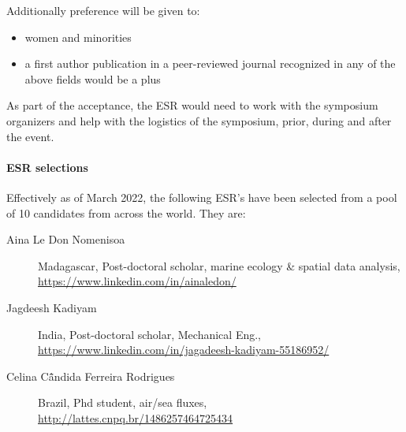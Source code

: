 \noindent
Additionally preference will be given to:

\begin{itemize}[noitemsep,topsep=0pt,parsep=0pt,partopsep=0pt]
\item women and minorities
\item a first author publication in a peer-reviewed journal recognized
  in any of the above fields would be a plus 
\end{itemize}

\noindent
As part of the acceptance, the ESR would need to work with the symposium
organizers and help with the logistics of the symposium, prior, during
and after the event. %

\paragraph{ESR selections} Effectively as of March 2022, the following
ESR's have been selected from a pool of 10 candidates from across the
world. They are:

\begin{description}

  \item[Aina Le Don Nomenisoa] Madagascar, Post-doctoral scholar,
    marine ecology \& spatial data analysis, \url{https://www.linkedin.com/in/ainaledon/}

  \item[Jagdeesh Kadiyam] India, Post-doctoral scholar, Mechanical Eng., \url{https://www.linkedin.com/in/jagadeesh-kadiyam-55186952/}

  \item[Celina C\~ândida Ferreira Rodrigues] Brazil, Phd student, air/sea fluxes, \url{http://lattes.cnpq.br/1486257464725434}

\end{description}  

